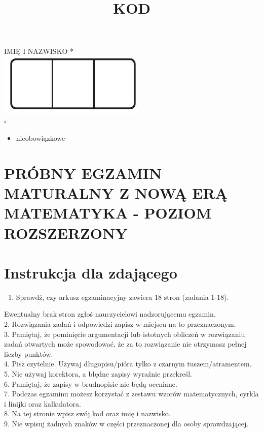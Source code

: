 \documentclass[10pt]{article}
\title{KOD }
\author{}
\date{}
\begin{document}
\maketitle
IMIĘ I NAZWISKO *\\
\includegraphics[max width=\textwidth, center]{2024_11_21_8206013b40ecc9b11a30g-01}\\
\(\square\)

\begin{itemize}
  \item nieobowiązkowe
\end{itemize}

\section*{PRÓBNY EGZAMIN MATURALNY Z NOWĄ ERĄ MATEMATYKA - POZIOM ROZSZERZONY}
\section*{Instrukcja dla zdającego}
\begin{enumerate}
  \item Sprawdź, czy arkusz egzaminacyjny zawiera 18 stron (zadania 1-18).
\end{enumerate}

Ewentualny brak stron zgłoś nauczycielowi nadzorującemu egzamin.\\
2. Rozwiązania zadań i odpowiedzi zapisz w miejscu na to przeznaczonym.\\
3. Pamiętaj, że pominięcie argumentacji lub istotnych obliczeń w rozwiązaniu zadań otwartych może spowodować, że za to rozwiązanie nie otrzymasz pełnej liczby punktów.\\
4. Pisz czytelnie. Używaj długopisu/pióra tylko z czarnym tuszem/atramentem.\\
5. Nie używaj korektora, a błędne zapisy wyraźnie przekreśl.\\
6. Pamiętaj, że zapisy w brudnopisie nie będą oceniane.\\
7. Podczas egzaminu możesz korzystać z zestawu wzorów matematycznych, cyrkla i linijki oraz kalkulatora.\\
8. Na tej stronie wpisz swój kod oraz imię i nazwisko.\\
9. Nie wpisuj żadnych znaków w części przeznaczonej dla osoby sprawdzającej.
\end{document}
